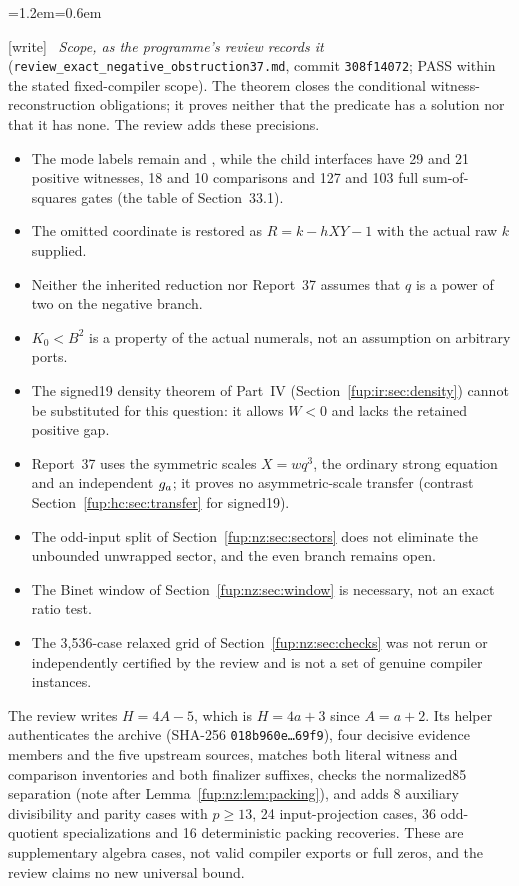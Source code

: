\documentclass[11pt,letterpaper]{article}
\theoremstyle{definition}\newtheorem{definition}[theorem]{Definition}
\theoremstyle{remark}\newtheorem{remark}[theorem]{Remark}
\newcommand{\code}[1]{\texttt{\detokenize{#1}}}
\newcommand{\wtag}{\textup{[write]}}
\newenvironment{writenote}{\par\smallskip\begin{list}{}{\leftmargin=1.2em\rightmargin=0.6em}\item[]\small\wtag\ }{\end{list}\smallskip}
\newcommand{\rw}[1]{\nolinkurl{#1}}%
\begin{document}
\begin{writenote}
\emph{Scope, as the programme's review records it} (\rw{review_exact_negative_obstruction37.md}, commit \texttt{308f14072}; PASS within the stated fixed-compiler scope). The theorem closes the conditional witness-reconstruction obligations; it proves neither that the predicate has a solution nor that it has none. The review adds these precisions.
\begin{itemize}
\item The mode labels remain \code{raw30} and \code{positive22}, while the child interfaces have 29 and 21 positive witnesses, 18 and 10 comparisons and 127 and 103 full sum-of-squares gates (the table of Section~33.1).
\item The omitted coordinate is restored as $R=k-hXY-1$ with the actual raw $k$ supplied.
\item Neither the inherited reduction nor Report~37 assumes that $q$ is a power of two on the negative branch.
\item $K_0<B^2$ is a property of the actual numerals, not an assumption on arbitrary ports.
\item The signed19 density theorem of Part~IV (Section~\ref{fup:ir:sec:density}) cannot be substituted for this question: it allows $W<0$ and lacks the retained positive gap.
\item Report~37 uses the symmetric scales $X=wq^3$, the ordinary strong equation and an independent $g_a$; it proves no asymmetric-scale transfer (contrast Section~\ref{fup:hc:sec:transfer} for signed19).
\item The odd-input split of Section~\ref{fup:nz:sec:sectors} does not eliminate the unbounded unwrapped sector, and the even branch remains open.
\item The Binet window of Section~\ref{fup:nz:sec:window} is necessary, not an exact ratio test.
\item The 3,536-case relaxed grid of Section~\ref{fup:nz:sec:checks} was not rerun or independently certified by the review and is not a set of genuine compiler instances.
\end{itemize}
The review writes $H=4A-5$, which is $H=4a+3$ since $A=a+2$. Its helper authenticates the archive (SHA-256 \texttt{018b960e\ldots 69f9}), four decisive evidence members and the five upstream sources, matches both literal witness and comparison inventories and both finalizer suffixes, checks the normalized85 separation (note after Lemma~\ref{fup:nz:lem:packing}), and adds 8 auxiliary divisibility and parity cases with $p\ge13$, 24 input-projection cases, 36 odd-quotient specializations and 16 deterministic packing recoveries. These are supplementary algebra cases, not valid compiler exports or full zeros, and the review claims no new universal bound.
\end{writenote}
\end{document}
